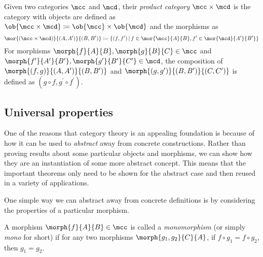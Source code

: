 \begin{example}
    Given two categories \(\mcc\) and \(\mcd\), their \emph{product category}
    \(\mcc \times \mcd\) is the category with objects are defined as \(
    \ob{\mcc \times \mcd} \coloneqq \ob{\mcc} \times \ob{\mcd}
    \) and the morphisms as \[
        \mor{(\mcc \times \mcd)}{(A, A^\prime)}{(B, B^\prime)}
        \coloneqq
        \{
        (f, f^\prime)
        \,|\,
        f \in \mor{\mcc}{A}{B},
        f^\prime \in \mor{\mcd}{A^\prime}{B^\prime}
        \}
    \]
    For morphisms \(\morph{f}{A}{B}, \morph{g}{B}{C} \in \mcc\) and \(
    \morph{f^\prime}{A^\prime}{B^\prime}, \morph{g^\prime}{B^\prime}{C^\prime}
    \in \mcd\), the composition of \(\morph{(f,g)}{(A,A^\prime)}{(B,B^\prime)}\)
    and \(\morph{(g,g^\prime)}{(B,B^\prime)}{(C,C^\prime)}\) is defined as
    \((g \circ f, g^\prime \circ f^\prime)\).
\end{example}

\subsection{Universal properties}

One of the reasons that category theory is an appealing foundation is because
of how it can be used to \emph{abstract} away from concrete constructions.
Rather than proving results about some particular objects and morphisms, we can
show how they are an instantiation of some more abstract concept.
This means that the important theorems only need to be shown for the abstract
case and then reused in a variety of applications.

One simple way we can abstract away from concrete definitions is by considering
the properties of a particular morphism.

\begin{definition}[Monomorphism]
    A morphism \(\morph{f}{A}{B} \in \mcc\) is called a \emph{monomorphism} (or
    simply \emph{mono} for short) if for any two morphisms
    \(\morph{g_1,g_2}{C}{A}\), if \(f \circ g_1 = f \circ g_2\), then
    \(g_1 = g_2\).
    \begin{center}
    \end{center}
\end{definition}

